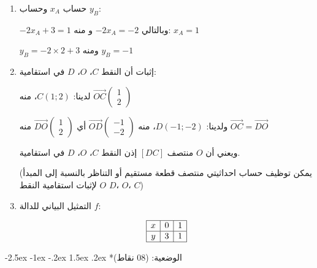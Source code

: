 \documentclass[12pt,a4paper]{article}
\makeatletter
\renewcommand\section{\@startsection{section}{1}{\z@}%
  {-2.5ex \@plus -1ex \@minus -.2ex}%
  {1.5ex \@plus.2ex}%
  {\normalfont\large\bfseries}}
\makeatother
\begin{document}
\begin{enumerate}
\item حساب $x_A$ وحساب $y_B$:

$-2x_A + 3 = 1$ وبالتالي $-2x_A = -2$ و منه: $x_A = 1$

$y_B = -2 \times 2 + 3$ ومنه $y_B = -1$

\item إثبات أن النقط $C$، $O$، $D$ في استقامية:

لدينا: $C(1;2)$، منه $\overrightarrow{OC}\begin{pmatrix}1\\2\end{pmatrix}$

ولدينا: $D(-1;-2)$، منه $\overrightarrow{OD}\begin{pmatrix}-1\\-2\end{pmatrix}$ أي $\overrightarrow{DO}\begin{pmatrix}1\\2\end{pmatrix}$ منه $\overrightarrow{OC} = \overrightarrow{DO}$

ويعني أن $O$ منتصف $[DC]$ إذن النقط $C$، $O$، $D$ في استقامية.

(يمكن توظيف حساب احداثيتي منتصف قطعة مستقيم أو التناظر بالنسبة إلى المبدأ $O$ لإثبات استقامية النقط $D$، $O$، $C$)

\item التمثيل البياني للدالة $f$:

\[
\begin{array}{|c|c|c|}
\hline
x & 0 & 1 \\
\hline
y & 3 & 1 \\
\hline
\end{array}
\]
\end{enumerate}

\section*{الوضعية: (08 نقاط)}
\end{document}
